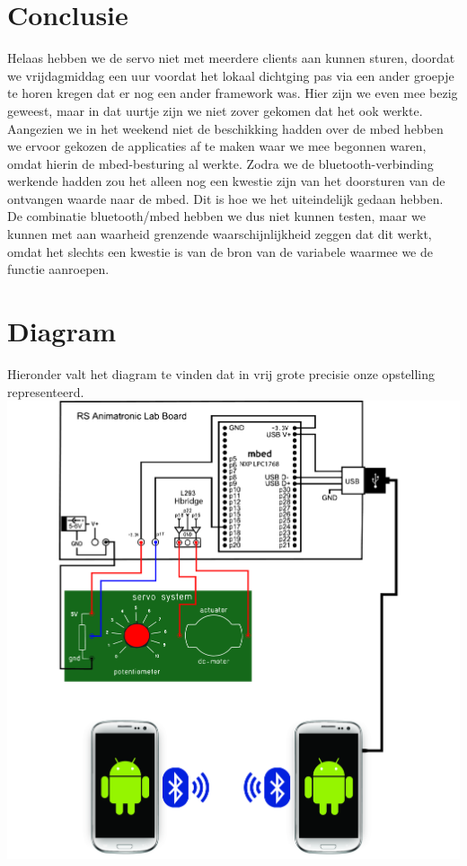 \documentclass[pdftex,12pt,a4paper]{article}
\begin{document}
\section{Conclusie}
Helaas hebben we de servo niet met meerdere clients aan kunnen sturen, doordat
we vrijdagmiddag een uur voordat het lokaal dichtging pas via een ander groepje
te horen kregen dat er nog een ander framework was. Hier zijn we even mee bezig
geweest, maar in dat uurtje zijn we niet zover gekomen dat het ook werkte.
Aangezien we in het weekend niet de beschikking hadden over de mbed hebben we
ervoor gekozen de applicaties af te maken waar we mee begonnen waren, omdat
hierin de mbed-besturing al werkte. Zodra we de bluetooth-verbinding werkende
hadden zou het alleen nog een kwestie zijn van het doorsturen van de ontvangen
waarde naar de mbed. Dit is hoe we het uiteindelijk gedaan hebben. De combinatie
bluetooth/mbed hebben we dus niet kunnen testen, maar we kunnen met aan waarheid
grenzende waarschijnlijkheid zeggen dat dit werkt, omdat het slechts een kwestie
is van de bron van de variabele waarmee we de functie aanroepen.\\


\section{Diagram}
Hieronder valt het diagram te vinden dat in vrij grote precisie onze opstelling representeerd.\\
\includegraphics[width=1\textwidth]{./diagram.jpg}\\
\end{document}
